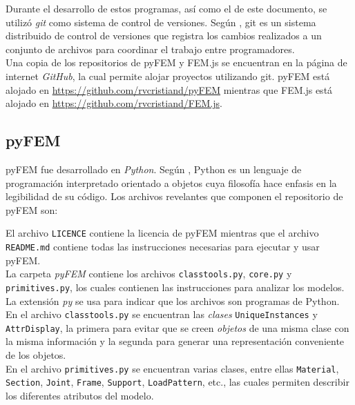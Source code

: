 Durante el desarrollo de estos programas, así como el de este documento, se utilizó \emph{git} como sistema de control de versiones. Según \cite{chacon2014git}, git es un sistema distribuido de control de versiones que registra los cambios realizados a un conjunto de archivos para coordinar el trabajo entre programadores.\\

Una copia de los repositorios de pyFEM y FEM.js se encuentran en la página de internet \emph{GitHub}, la cual permite alojar proyectos utilizando git. pyFEM está alojado en \url{https://github.com/rvcristiand/pyFEM} mientras que FEM.js está alojado en \url{https://github.com/rvcristiand/FEM.js}.\\

\subsection{pyFEM}

pyFEM fue desarrollado en \emph{Python}. Según \cite{lutz2013python}, Python es un lenguaje de programación interpretado orientado a objetos cuya filosofía hace enfasis en la legibilidad de su código. Los archivos revelantes que componen el repositorio de pyFEM son:
\pagebreak

\bigskip
El archivo \verb|LICENCE| contiene la licencia de pyFEM mientras que el archivo \verb|README.md| contiene todas las instrucciones necesarias para ejecutar y usar pyFEM.\\

La carpeta \emph{pyFEM} contiene los archivos \verb|classtools.py|, \verb|core.py| y \verb|primitives.py|, los cuales contienen las instrucciones para analizar los modelos. La extensión \emph{py} se usa para indicar que los archivos son programas de Python.\\

En el archivo \verb|classtools.py| se encuentran las \emph{clases} \verb|UniqueInstances| y \verb|AttrDisplay|, la primera para evitar que se creen \emph{objetos} de una misma clase con la misma información y la segunda para generar una representación conveniente de los objetos.\\

En el archivo \verb|primitives.py| se encuentran varias clases, entre ellas \verb|Material|, \verb|Section|, \verb|Joint|, \verb|Frame|, \verb|Support|, \verb|LoadPattern|, etc., las cuales permiten describir los diferentes atributos del modelo.\\

